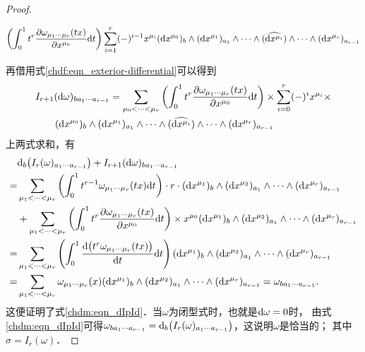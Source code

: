 \begin{proof}
\begin{small}
\begin{align*}
        \left( \int_{0}^{1}t^{r} \frac{\partial \omega_{\mu_{1}\cdots \mu_{r}}(tx)}
        {\partial x^{\mu_{0}}} {\rm d}t \right)  \sum_{i=1}^{r} (-)^{i-1}
        x^{\mu_i}({\rm d}x^{\mu_{0}})_{b}\wedge  ({\rm d}x^{\mu_1})_{a_{1}} \wedge\cdots\wedge
        (\widehat{{\rm d}x^{\mu_i}}) \wedge \cdots \wedge ({\rm d}x^{\mu_r})_{a_{r-1}}
    \end{align*}
    \end{small}\setlength{\mathindent}{2em}
    再借用式\eqref{chdf:eqn_exterior-differential}可以得到
    \begin{align*}
        &I_{r+1}({\rm d}\omega )_{ba_{1}\cdots a_{r-1}} = \sum_{\mu_{0}<\cdots<\mu_{r}}
         \left( \int_{0}^{1}t^{r}  \frac{\partial \omega_{\mu_{1}\cdots \mu_{r}}(tx) }{\partial x^{\mu_{0}}}
         {\rm d}t \right) \times   \sum_{i=0}^{r}  (-)^{i} x^{\mu_i} \times \\
        &\qquad ({\rm d}x^{\mu_{0}})_{b} \wedge
        ({\rm d}x^{\mu_1})_{a_{1}} \wedge\cdots \wedge(\widehat{{\rm d}x^{\mu_i}})\wedge \cdots
        \wedge ({\rm d}x^{\mu_r})_{a_{r-1}}
    \end{align*}
    上两式求和，有
    \begin{align*}
        &{\rm d}_{b}\bigl( I_r (\omega)_{a_{1}\cdots a_{r-1}} \bigr)+I_{r+1}({\rm d}\omega )_{ba_{1}\cdots a_{r-1}}\\
        =& \sum_{\mu_{1}<\cdots<\mu_{r}}
        \left( \int_{0}^{1}t^{r-1} \omega_{\mu_{1}\cdots \mu_{r}}(tx){\rm d}t \right)\cdot r\cdot
        ({\rm d}x^{\mu_1})_{b}\wedge ({\rm d}x^{\mu_2})_{a_{1}} \wedge\cdots\wedge ({\rm d}x^{\mu_r})_{a_{r-1}}   \\
        & + \sum_{\mu_{1}<\cdots<\mu_{r}}  \left( \int_{0}^{1}t^{r}
        \frac{\partial \omega_{\mu_{1}\cdots \mu_{r}}(tx) }{\partial x^{\mu_{0}}}   {\rm d}t \right)
        \times   x^{\mu_0} ({\rm d}x^{\mu_{1}})_{b} \wedge
        ({\rm d}x^{\mu_2})_{a_{1}} \wedge\cdots  \wedge ({\rm d}x^{\mu_r})_{a_{r-1}} \\
        =& \sum_{\mu_{1}<\cdots<\mu_{r}} \left( \int_{0}^{1}
        \frac{{\rm d} \bigl(t^{r} \omega_{\mu_{1}\cdots \mu_{r}}(tx)\bigr) } {{\rm d}t} {\rm d}t \right)
        ({\rm d}x^{\mu_1})_{b}\wedge ({\rm d}x^{\mu_2})_{a_{1}} \wedge\cdots\wedge ({\rm d}x^{\mu_r})_{a_{r-1}} \\
        =& \sum_{\mu_{1}<\cdots<\mu_{r}} \omega_{\mu_{1}\cdots \mu_{r}}(x)
         ({\rm d}x^{\mu_1})_{b}\wedge ({\rm d}x^{\mu_2})_{a_{1}} \wedge\cdots\wedge
         ({\rm d}x^{\mu_r})_{a_{r-1}} = \omega_{b a_{1} \cdots a_{r-1}}.
    \end{align*}
    这便证明了式\eqref{chdm:eqn_dIpId}．当$\omega$为闭型式时，也就是${\rm d}\omega=0$时，
    由式\eqref{chdm:eqn_dIpId}可得$\omega_{b a_{1} \cdots a_{r-1}}=
    {\rm d}_{b}\bigl( I_r (\omega)_{a_{1}\cdots a_{r-1}} \bigr) $，这说明$\omega$是恰当的；
    其中$\sigma = I_r (\omega)$．
\end{proof}

